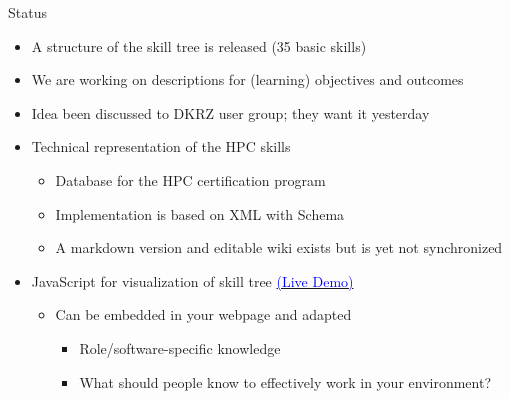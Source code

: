 \documentclass[compress,aspectratio=169]{beamer}
\newcommand{\hrefb}[2]{\href{#1}{\textcolor{blue}{#2}}}
\begin{document}
\begin{frame}{Status}
		\begin{block}{}
			\begin{itemize}
				\item A structure of the skill tree is released (35 basic skills)
				\item We are working on descriptions for (learning) objectives and outcomes
				\item Idea been discussed to DKRZ user group; they want it yesterday
				\item Technical representation of the HPC skills
				\begin{itemize}
					\item Database for the HPC certification program
					\item Implementation is based on XML with Schema
				  \item A markdown version and editable wiki exists but is yet not synchronized
				\end{itemize}
				\item JavaScript for visualization of skill tree \hrefb{https://www.hpc-certification.org/skills/}{(Live Demo)}
					\begin{itemize}
						\item Can be embedded in your webpage and adapted
							\begin{itemize}
								\item Role/software-specific knowledge
								\item What should people know to effectively work in your environment?
							\end{itemize}
					\end{itemize}
			\end{itemize}
		\end{block}
\end{frame}
\end{document}
